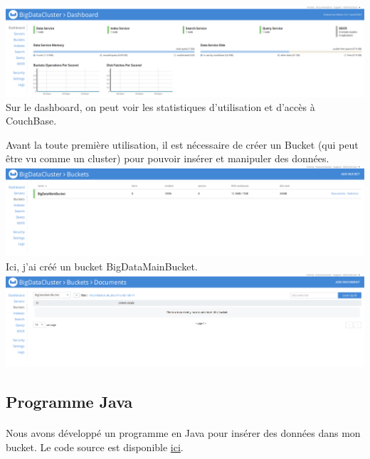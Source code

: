 \documentclass{article}
\begin{document}
  \includegraphics[scale=0.2]{couchBase/dashboard.png}\\

  Sur le dashboard, on peut voir les statistiques d’utilisation et d’accès à CouchBase.\

  Avant la toute première utilisation, il est nécessaire de créer un Bucket (qui peut être vu comme un cluster) pour pouvoir insérer et manipuler des données.\\

  \includegraphics[scale=0.2]{couchBase/bucket.png}\\

  Ici, j’ai créé un bucket BigDataMainBucket.\\

  \includegraphics[scale=0.2]{couchBase/document.png}\\

\subsection{Programme Java}
  \paragraph{} 
  Nous avons développé un programme en Java pour insérer des données dans mon bucket. Le code source est disponible \href{https://github.com/CorentinLeGuen/Data-Mining}{ici}.\
  
\end{document}
